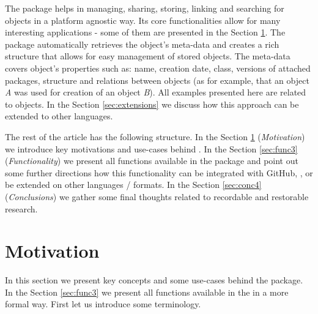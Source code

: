 \documentclass[nojss]{jss}\usepackage[]{graphicx}\usepackage[]{color}
\begin{document}
The  package helps in managing, sharing, storing, linking and searching for  objects {in a platform agnostic way}. Its core functionalities allow for many interesting applications - some of them are presented in the Section \ref{sec:mot2}. The  package automatically retrieves the object's meta-data and creates a rich structure that allows for easy management of stored  objects. The meta-data covers object's properties such as: name, creation date, class, versions of attached packages, structure and relations between  objects (as for example, that an object \textit{A} was used for creation of an object \textit{B}). All examples presented here are related to  objects. In the Section \ref{sec:extensions} we discuss how this approach can be extended to other languages.

The rest of the article has the following structure. In the Section \ref{sec:mot2} (\textit{Motivation}) we introduce key motivations and use-cases behind . In the Section \ref{sec:func3} (\textit{Functionality}) we present all functions available in the package and point out some further directions how this functionality can be integrated with GitHub, , or be extended on other languages / formats. In the Section \ref{sec:conc4} (\textit{Conclusions}) we gather some final thoughts related to recordable and restorable research.


\section{Motivation}
\label{sec:mot2}

In this section we present key concepts and some use-cases behind the  package. In the Section \ref{sec:func3} we present all functions available in the  in a more formal way. First let us introduce some terminology. 
\end{document}
